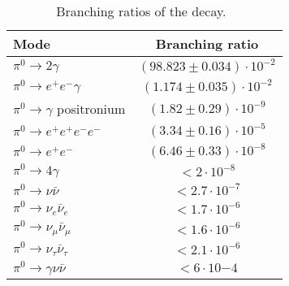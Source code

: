 \begin{table}
\begin{minipage}{\textwidth}
\begin{center}
\begin{singlespacing}

\caption[Branching Ratios of the \piz Decay]{\label{tab:pi0} Branching ratios of the \piz decay.~\cite{pdg2014}}
\begin{tabular}{l|c}
\hline												
Mode	& Branching ratio \\ \hline 	
$\pi^0 \to 2\gamma$	 &   $ (98.823 \pm 0.034)  \cdot 10^{-2}$ \\	
$\pi^0 \to e^+ e^-\gamma$  &  $  (1.174 \pm 0.035)  \cdot 10^{-2}$ \\
$\pi^0 \to \gamma $ positronium   &  $ (1.82 \pm 0.29)  \cdot 10^{-9}$\\
$\pi^0 \to  e^+ e^+ e^- e^-	$  &  $( 3.34 \pm 0.16)  \cdot 10^{-5}$\\
$\pi^0 \to  e^+ e^-$  &  $ (6.46 \pm 0.33)  \cdot  10^{-8}$\\
$\pi^0 \to 4\gamma$	&  $<2 \cdot 10^{-8}$\\
$\pi^0 \to \nu \bar \nu$  &  $<2.7 \cdot 10^{-7}$\\
$\pi^0 \to \nu_e \bar \nu_e$  &  $<1.7 \cdot 10^{-6}$\\
$\pi^0 \to \nu_{\mu} \bar \nu_{\mu}$  &  $<1.6 \cdot 10^{-6}$\\
$\pi^0 \to \nu_\tau \bar \nu_\tau $  &  $<2.1 \cdot 10^{-6}$\\
$\pi^0 \to \gamma \nu \bar \nu$	 &  $<6 \cdot 10{-4}$\\
\hline \hline%
\end{tabular}

\end{singlespacing}
\end{center}
\end{minipage}
\end{table}
\vspace{20pt}